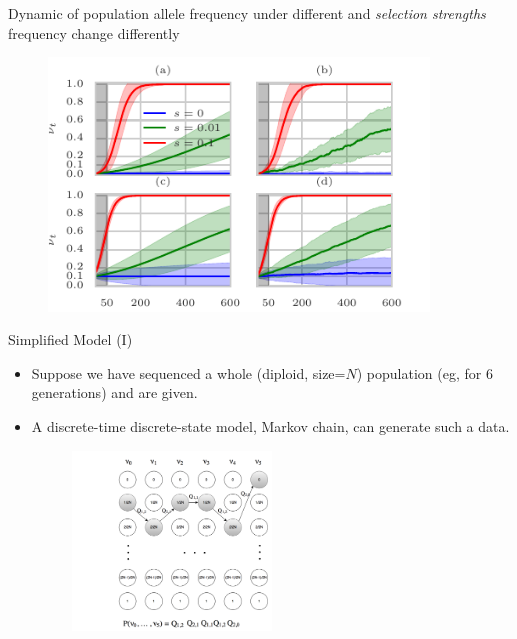 \documentclass[t]{beamer} %
\begin{document}
\begin{frame}{Dynamic of population allele frequency }
	under different  and \emph{selection strengths} 
	frequency 
	change differently
	\begin{figure}
		\includegraphics[trim={0in 0.0in 0.0in 
			0in},clip,width=0.9\textwidth]{../figures/AF.pdf}
	\end{figure}
\end{frame}


\begin{frame}{ Simplified Model (I)}
	\begin{itemize}
		\item  Suppose we have sequenced a whole (diploid, size=$N$) 
		population  (eg, for 6 generations) and  are given.
	\pause
		\item A discrete-time discrete-state model, Markov chain, can 
		generate such a data.
		\begin{figure}
			\includegraphics[trim={.05in 0in 0.0in 
				0.5in},clip,width=0.5\textwidth]{../figures/markoveg.png}
		\end{figure}
	\end{itemize}
\end{frame}
\end{document}
